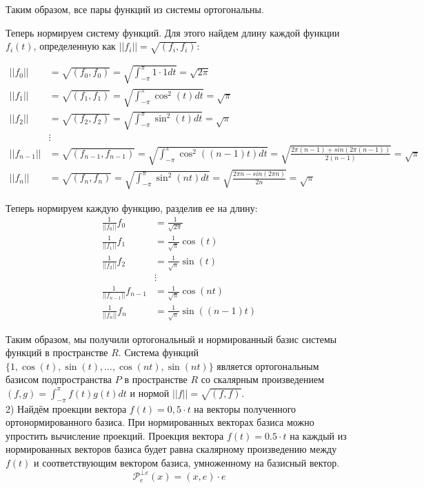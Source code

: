 \documentclass{article}
\begin{document}
Таким образом, все пары функций из системы ортогональны. 

Теперь нормируем систему функций. Для этого найдем длину каждой функции $f_i(t)$, определенную как $||f_i|| = \sqrt{(f_i, f_i)}$:

\begin{align*}
||f_0|| &= \sqrt{(f_0, f_0)} = \sqrt{\int_{-\pi}^{\pi} 1 \cdot 1 dt} = \sqrt{2\pi}\\
||f_1|| &= \sqrt{(f_1, f_1)} = \sqrt{\int_{-\pi}^{\pi} \cos^2(t) dt} = \sqrt{\pi}\\
||f_2|| &= \sqrt{(f_2, f_2)} = \sqrt{\int_{-\pi}^{\pi} \sin^2(t) dt} = \sqrt{\pi}\\
&\vdots\\
||f_{n-1}|| &= \sqrt{(f_{n-1}, f_{n-1})} = \sqrt{\int_{-\pi}^{\pi} \cos^2((n-1)t) dt} = \sqrt{\frac{2\pi (n-1)+sin(2\pi (n-1))}{2(n-1)}} =  \sqrt{\pi}\\
||f_n|| &= \sqrt{(f_n, f_n)} = \sqrt{\int_{-\pi}^{\pi} \sin^2(nt) dt} = \sqrt{\frac{2\pi n-sin(2\pi n)}{2n}} = \sqrt{\pi}
\end{align*}

Теперь нормируем каждую функцию, разделив ее на длину:
\begin{align*}
\frac{1}{||f_0||}f_0 &= \frac{1}{\sqrt{2\pi}}\\
\frac{1}{||f_1||}f_1 &= \frac{1}{\sqrt{\pi}}\cos(t)\\
\frac{1}{||f_2||}f_2 &= \frac{1}{\sqrt{\pi}}\sin(t)\\
&\vdots\\
\frac{1}{||f_{n-1}||}f_{n-1} &= \frac{1}{\sqrt{\pi}}\cos(nt)\\
\frac{1}{||f_n||}f_n &= \frac{1}{\sqrt{\pi}}\sin((n-1)t)
\end{align*}

Таким образом, мы получили ортогональный и нормированный базис системы функций в пространстве $R$.
Система функций $\{1, \cos(t), \sin(t), ..., \cos(nt), \sin(nt)\}$ является ортогональным базисом подпространства $P$ в пространстве $R$ со скалярным произведением $(f,g)=\int_{-\pi}^{\pi} f(t)g(t)dt$ и нормой $||f||=\sqrt{(f,f)}$.\\


2) Найдём проекции вектора $f(t)=0,5\cdot t$ на векторы полученного ортонормированного
базиса.
При нормированных векторах базиса можно упростить вычисление проекций. Проекция вектора $f(t) = 0.5 \cdot t$ на каждый из нормированных векторов базиса будет равна скалярному произведению между $f(t)$ и соответствующим вектором базиса, умноженному на базисный вектор.
\begin{equation*}
    \mathcal{P}_{e}^{\bot e}(x) = (x,e)\cdot e
\end{equation*}
\end{document}
